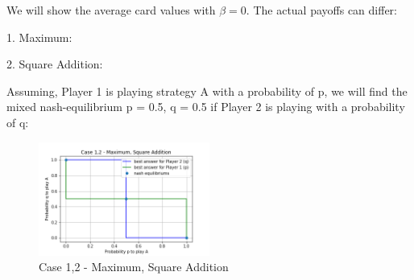 We will show the average card values with $\beta =0$. The actual payoffs can differ:
\begin{table}[h]
\end{table}

1. Maximum:
\begin{table}[h]
\end{table}

2. Square Addition:
\begin{table}[h]
\end{table}

Assuming, Player 1 is playing strategy A with a probability of p, we will find the mixed nash-equilibrium p = 0.5, q = 0.5 if Player 2 is playing with a probability of q:

\begin{figure}[!ht]
    \centering
    \includegraphics[width=0.5\textwidth]{Bilder/5_max}
    \caption{Case 1,2 - Maximum, Square Addition}
    \label{fig:15}
\end{figure}

